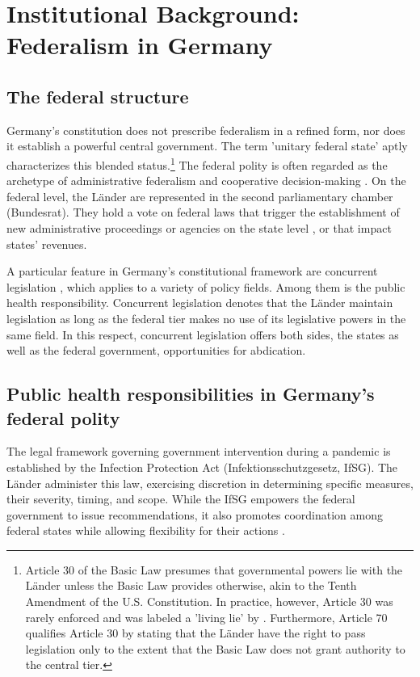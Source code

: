 \documentclass[authoryear,12pt, 3p]{elsarticle}
\theoremstyle{break}
\begin{document}
\section[Federalism in Germany]{Institutional Background: Federalism in Germany}\label{FederalisminGermany}
%
\subsection[The federal structure]{The federal structure}\label{FederalStructure}
Germany's constitution does not prescribe federalism in a refined form, nor does it establish a powerful central government. The term 'unitary federal state' \citep{Hesse1962, Turner2013} aptly characterizes this blended status.\footnote{
	Article 30 of the Basic Law presumes that governmental powers lie with the Länder unless the Basic Law provides otherwise, akin to the Tenth Amendment of the U.S. Constitution. In practice, however, Article 30 was rarely enforced and was labeled a 'living lie' by \cite{Scharpf1994}. Furthermore, Article 70 qualifies Article 30 by stating that the Länder have the right to pass legislation only to the extent that the Basic Law does not grant authority to the central tier.
} The federal polity is often regarded as the archetype of administrative federalism and cooperative decision-making \citep{Kropp2016}. On the federal level, the Länder are represented in the second parliamentary chamber (Bundesrat). They hold a vote on federal laws that trigger the establishment of new administrative proceedings or agencies on the state level \citep{Burkhart2008}, or that impact states' revenues. 

A particular feature in Germany's constitutional framework are concurrent legislation \citep{Gunlicks2007}, which applies to a variety of policy fields. Among them is the public health responsibility. Concurrent legislation denotes that the Länder maintain legislation as long as the federal tier makes no use of its legislative powers in the same field. In this respect, concurrent legislation offers both sides, the states as well as the federal government, opportunities for abdication.

\subsection{Public health responsibilities in Germany's federal polity}
The legal framework governing government intervention during a pandemic is established by the Infection Protection Act (Infektionsschutzgesetz, IfSG). The Länder administer this law, exercising discretion in determining specific measures, their severity, timing, and scope. While the IfSG empowers the federal government to issue recommendations, it also promotes coordination among federal states while allowing flexibility for their actions \citep{Tonti2022}.  
\end{document}
